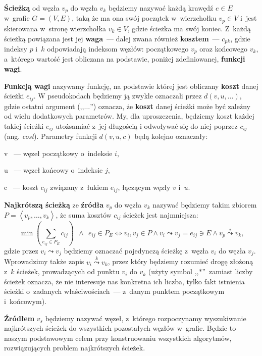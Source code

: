 \begin{myitemize}
	\item \textbf{Ścieżką} od węzła $v_{p}$ do węzła $v_{k}$ będziemy nazywać każdą krawędź $e \in E$ w~grafie $G = \left( V, E \right)$, taką że ma ona swój początek w~wierzchołku $v_{p} \in V$ i~jest skierowana w~stronę wierzchołka $v_{k} \in V$, gdzie ścieżka ma swój koniec.
	Z~każdą ścieżką powiązana jest jej \textbf{waga}~--- dalej zwana również \textbf{kosztem}~--- $c_{pk}$, gdzie indeksy $p$ i~$k$ odpowiadają indeksom węzłów: początkowego $v_{p}$ oraz końcowego $v_{k}$, a~którego wartość jest obliczana na podstawie, poniżej zdefiniowanej, \textbf{funkcji wagi}.
	\item \textbf{Funkcją wagi} nazywamy funkcję, na podstawie której jest obliczany \textbf{koszt} danej ścieżki $e_{ij}$.
	W pseudokodach będziemy ją zwykle oznaczali przez $d \left( v, u, \dots \right)$, gdzie ostatni argument (,,$\dots$'') oznacza, że \textbf{koszt} danej ścieżki może być zależny od wielu dodatkowych parametrów.
	My, dla uproszczenia, będziemy koszt każdej takiej ścieżki $e_{ij}$ utożsamiać z~jej długością i odwoływać się do niej poprzez $c_{ij}$ (ang. \textit{cost}).
	Parametry funkcji $d \left( v, u, c \right)$ będą kolejno oznaczały:
	\begin{myitemize}
		\item[v]~--- węzeł początkowy o~indeksie $i$,
		\item[u]~--- węzeł końcowy o~indeksie $j$,
		\item[c]~--- koszt $c_{ij}$ związany z~łukiem $e_{ij}$, łączącym węzły $v$ i~$u$.
	\end{myitemize}
	\item \textbf{Najkrótszą ścieżką} ze \textbf{źródła} $v_{p}$ do węzła $v_{k}$ nazywać będziemy takim zbiorem $P = \left \langle v_{p}, \dots, v_{k} \right \rangle$, że suma kosztów $c_{ij}$ ścieżek jest najmniejsza:
	\begin{equation}
		\min \left( \sum_{e_{ij} \in P_{E}} c_{ij} \right) \: \: \wedge \: \: e_{ij} \in P_{E} \Leftrightarrow v_{i},v_{j} \in P \wedge v_{i} \leadsto v_{j} = e_{ij} \ni E \wedge v_{p} \overset{*}\leadsto v_{k}\textrm{,}
	\end{equation}
	gdzie przez $v_{i} \leadsto v_{j}$ będziemy oznaczać pojedynczą ścieżkę z~węzła $v_{i}$ do węzła $v_{j}$.
	Wprowadzimy także zapis $v_{i} \overset{k}\leadsto v_{k}$, przez który będziemy rozumieć drogę złożoną z~$k$ ścieżek, prowadzących od punktu $v_{i}$ do $v_{k}$ (użyty symbol ,,$*$''~zamiast liczby ścieżek oznacza, że nie interesuje nas konkretna ich liczba, tylko fakt istnienia ścieżki o~zadanych właściwościach~--- z~danym punktem początkowym i~końcowym). 
	\item \textbf{Źródłem} $v_{s}$ będziemy nazywać węzeł, z~którego rozpoczynamy wyszukiwanie najkrótszych ścieżek do wszystkich pozostałych węzłów w~grafie.
	Będzie to naszym podstawowym celem przy konstruowaniu wszystkich algorytmów, rozwiązujących problem najkrótszych ścieżek.
\end{myitemize}



